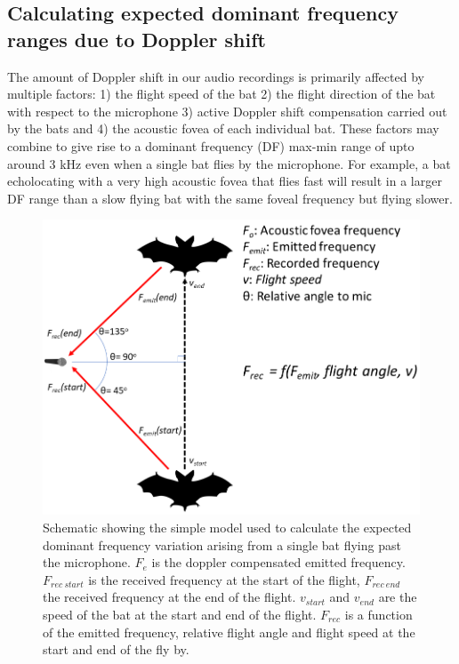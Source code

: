 \documentclass[
]{book}
\begin{document}
\hypertarget{simdomfreqranges}{%
\subsection{Calculating expected dominant frequency ranges due to Doppler shift}\label{simdomfreqranges}}

The amount of Doppler shift in our audio recordings is primarily affected by multiple factors: 1) the flight speed of the bat 2) the flight direction of the bat with respect to the microphone 3) active Doppler shift compensation carried out by the bats and 4) the acoustic fovea of each individual bat. These factors may combine to give rise to a dominant frequency (DF) max-min range of upto around 3 kHz even when a single bat flies by the microphone. For example, a bat echolocating with a very high acoustic fovea that flies fast will result in a larger DF range than a slow flying bat with the same foveal frequency but flying slower.

\begin{figure}
\includegraphics[width=1\linewidth]{original_papers/hbc-paper/figures/doppler_shift_schematic} \caption{Schematic showing the simple model used to calculate the expected dominant frequency variation arising from a single bat flying past the microphone. $F_{e}$ is the doppler compensated emitted frequency. $F_{rec \:start}$ is the received frequency at the start of the flight, $F_{rec \:end}$ the received frequency at the end of the flight. $v_{start}$ and $v_{end}$ are the speed of the bat at the start and end of the flight. $F_{rec}$ is a function of the emitted frequency, relative flight angle and flight speed at the start and end of the fly by.}\label{fig:dopplerschematic}
\end{figure}
\end{document}
